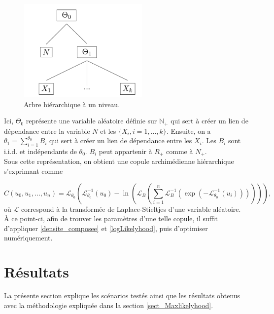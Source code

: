 \documentclass{article}
\begin{document}
		\begin{figure}[H]
			\centering
			\includegraphics[height=5cm]{Hierarchie}
			\renewcommand{\figurename}{Illustration}
			\caption{Arbre hiérarchique à un niveau.} \label{graph_hierarchie}
		\end{figure}
	
		Ici, $\Theta_0$ représente une variable aléatoire définie sur $\mathbb{N}_+$ qui sert à créer un lien de dépendance entre la variable $N$ et les $\{X_i, i=1,\dots , k\}$. Ensuite, on a $\theta_1 = \sum_{i=1}^{\theta_0} B_i$ qui sert à créer un lien de dépendance entre les $X_i$. Les $B_i$ sont i.i.d. et indépendants de $\theta_0$. $B_i$ peut appartenir à $R_+$ comme à $N_+$. \\
		
		Sous cette représentation, on obtient une copule archimédienne hiérarchique s'exprimant comme
		
		\begin{equation}
		C(u_0, u_1, \dots, u_n) =
			\mathscr{L}_{\theta_0} \left(
				\mathscr{L}_{\theta_0}^{-1}(u_0) - \ln \left( 
					\mathscr{L}_B  \left(
						\sum_{i=1}^{n} \mathscr{L}_{B}^{-1} \left(
						 \exp \left(
						  - \mathscr{L}_{\theta_0}^{-1}(u_i) 
						  \right) \right)\right)\right)\right),
		\end{equation}
		où $\mathscr{L}$ correspond à la transformée de Laplace-Stieltjes d'une variable aléatoire.\\
		
		À ce point-ci, afin de trouver les paramètres d'une telle copule, il suffit d'appliquer \eqref{densite_composee} et \eqref{logLikelyhood}, puis d'optimiser numériquement.
		
	\section{Résultats}
		La présente section explique les scénarios testés ainsi que les résultats obtenus avec la méthodologie expliquée dans la section \ref{sect_Maxlikelyhood}.\\
		
\end{document}
